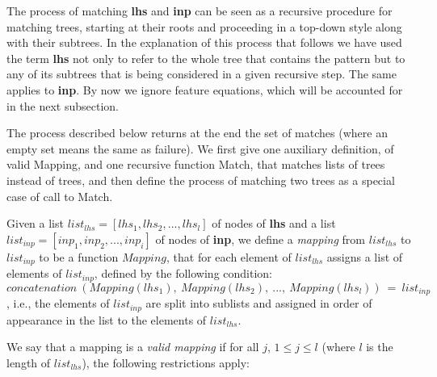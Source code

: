 The process of matching {\bf lhs} and {\bf inp} can be seen as a recursive 
procedure for matching trees, starting at their roots and proceeding in a 
top-down style along with their subtrees. 
In the explanation of this process that 
follows we have used the term {\bf lhs} not only to refer to the whole tree 
that contains the pattern 
but to any of its subtrees that is being considered in a 
given recursive step. The same applies to {\bf inp}. 
By now we ignore feature equations,
which will be accounted for in the next subsection.

The process described below returns 
at the end the set of matches (where an empty set means the same 
as failure). We first give one auxiliary definition, of valid Mapping, and
one recursive function Match, that matches lists of trees instead of trees,
and then define the process of matching two trees as a special case of
call to Match.

Given a list $list_{lhs}=[lhs_1, lhs_2, ..., lhs_l]$ of nodes of {\bf lhs}
and a list $list_{inp}=[inp_1, inp_2, ..., inp_i]$ of nodes of {\bf inp},
we define a {\it mapping} from $list_{lhs}$ to $list_{inp}$ to be a function
$Mapping$,
that for each element of $list_{lhs}$ assigns a list of elements of 
$list_{inp}$, defined by the following condition:
$$concatenation\ (Mapping(lhs_1),\ Mapping(lhs_2),\ ...,\ Mapping(lhs_l))\ =\ 
        list_{inp}$$,
i.e., the elements of $list_{inp}$ are split into sublists and assigned in 
order of appearance in the list to the elements of $list_{lhs}$.

We say that a mapping is a {\it valid mapping} if for all $j$, $1\leq j \leq l$
(where $l$ is the length of $list_{lhs}$), the following restrictions apply:

